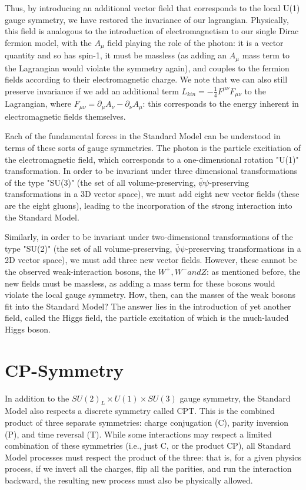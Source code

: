 Thus, by introducing an additional vector field that corresponds to the local U(1) gauge symmetry, we have restored the invariance of our lagrangian. Physically, this field is analogous to the introduction of electromagnetism to our single Dirac fermion model, with the $A_\mu$ field playing the role of the photon: it is a vector quantity and so has spin-1, it must be massless (as adding an $A_\mu$ mass term to the Lagrangian would violate the symmetry again), and couples to the fermion fields according to their electromagnetic charge. We note that we can also still preserve invariance if we add an additional term $L_{kin} = -\frac{1}{4}F^{\mu \nu} F_{\mu \nu}$ to the Lagrangian, where $F_{\mu \nu} = \partial_{\mu} A_{\nu} - \partial_{\nu} A_{\mu}$: this corresponds to the energy inherent in electromagnetic fields themselves. 

Each of the fundamental forces in the Standard Model can be understood in terms of these sorts of gauge symmetries. The photon is the particle excitiation of the electromagnetic field, which corresponds to a one-dimensional rotation "U(1)" transformation. In order to be invariant under three dimensional transformations of the type "SU(3)" (the set of all volume-preserving, $\bar{\psi}\psi$-preserving transformations in a 3D vector space), we must add eight new vector fields (these are the eight gluons), leading to the incorporation of the strong interaction into the Standard Model.

Similarly, in order to be invariant under two-dimensional transformations of the type "SU(2)" (the set of all volume-preserving, $\bar{\psi}\psi$-preserving transformations in a 2D vector space), we must add three new vector fields. However, these cannot be the observed weak-interaction bosons, the $W^{+}, W^{-} and Z$: as mentioned before, the new fields must be massless, as adding a mass term for these bosons would violate the local gauge symmetry. How, then, can the masses of the weak bosons fit into the Standard Model? The answer lies in the introduction of yet another field, called the Higgs field, the particle excitation of which is the much-lauded Higgs boson.

\section{CP-Symmetry}\label{sec:CP}

In addition to the $SU(2)_{L} \times U(1) \times SU(3)$ gauge symmetry, the Standard Model also respects a discrete symmetry called CPT. This is the combined product of three separate symmetries: charge conjugation (C), parity inversion (P), and time reversal (T). While some interactions may respect a limited combination of these symmetries (i.e., just C, or the product CP), all Standard Model processes must respect the product of the three: that is, for a given physics process, if we invert all the charges, flip all the parities, and run the interaction backward, the resulting new process must also be physically allowed.

